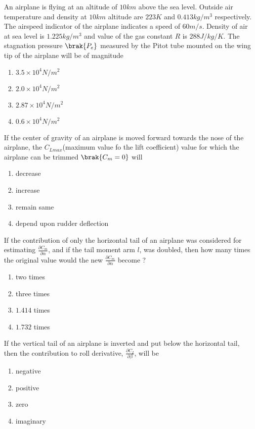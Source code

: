 	\item An airplane is flying at an altitude of $10km$ above the sea level. Outside air temperature and density at $10km$ altitude are $223 K$ and $0.413 kg/ m^3 $ respectively. The airspeed indicator of the airplane indicates a speed of $60 m/s$. Density of air at sea level is $1.225 kg/m^3$ and value of the gas constant $R$ is $288 J/kg/K$. The stagnation pressure $\brak{P_e}$ measured by the Pitot tube mounted on the wing tip of the airplane will be of magnitude
		\begin{enumerate}
			\item $3.5 \times 10^4 N/m^2$
			\item $2.0 \times 10^4 N/m^2$
			\item $2.87 \times 10^4 N/m^2$
			\item $0.6 \times 10^4 N/m^2$
		\end{enumerate}

	\item If the center of gravity of an airplane is moved forward towards the nose of the airplane, the $C_{L max}$(maximum value fo the lift coefficient) value for which the airplane can be trimmed $\brak{C_m = 0}$ will
		\begin{enumerate}
			\item decrease
			\item increase
			\item remain same
			\item depend upon rudder deflection
		\end{enumerate}

	\item If the contribution of only the horizontal tail of an airplane was considered for estimating $\frac{\partial C_m}{\partial \alpha}$, and if the tail moment arm $l$, was doubled, then how many times the original value would the new $\frac{\partial C_m}{\partial \alpha}$ become ?
		\begin{enumerate}
			\item two times
			\item three times
			\item $1.414$ times
			\item $1.732$ times
		\end{enumerate}

	\item If the vertical tail of an airplane is inverted and put below the horizontal tail, then the contribution to roll derivative, $\frac{\partial C_I}{\partial \beta}$, will be
		\begin{enumerate}
			\item negative
			\item positive
			\item zero
			\item imaginary
		\end{enumerate}
		
